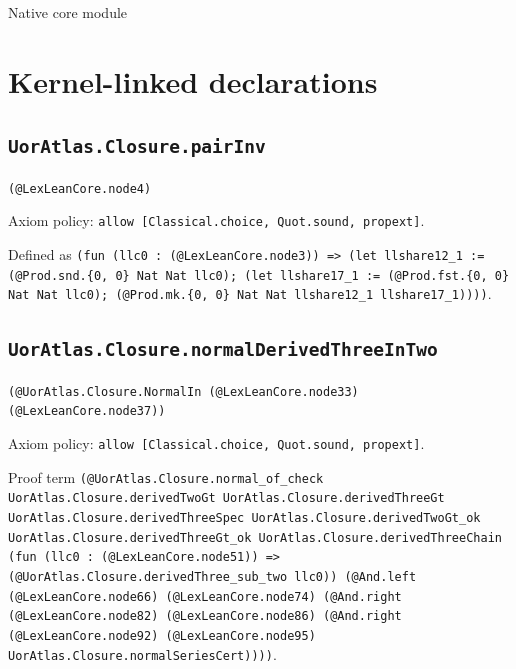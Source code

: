 \documentclass[11pt]{article}
\begin{document}
\begin{center}{\LARGE Native core module}\end{center}
\section*{Kernel-linked declarations}
\subsection*{\texttt{UorAtlas.Closure.pairInv}}
\noindent\texttt{(@LexLeanCore.node4)}\par
\noindent Axiom policy: \texttt{allow [Classical.choice, Quot.sound, propext]}.\par
\noindent Defined as \texttt{(fun (llc0 : (@LexLeanCore.node3)) => (let llshare12\_1 := (@Prod.snd.\{0, 0\} Nat Nat llc0); (let llshare17\_1 := (@Prod.fst.\{0, 0\} Nat Nat llc0); (@Prod.mk.\{0, 0\} Nat Nat llshare12\_1 llshare17\_1))))}.\par
\subsection*{\texttt{UorAtlas.Closure.normalDerivedThreeInTwo}}
\noindent\texttt{(@UorAtlas.Closure.NormalIn (@LexLeanCore.node33) (@LexLeanCore.node37))}\par
\noindent Axiom policy: \texttt{allow [Classical.choice, Quot.sound, propext]}.\par
\noindent Proof term \texttt{(@UorAtlas.Closure.normal\_of\_check UorAtlas.Closure.derivedTwoGt UorAtlas.Closure.derivedThreeGt UorAtlas.Closure.derivedThreeSpec UorAtlas.Closure.derivedTwoGt\_ok UorAtlas.Closure.derivedThreeGt\_ok UorAtlas.Closure.derivedThreeChain (fun (llc0 : (@LexLeanCore.node51)) => (@UorAtlas.Closure.derivedThree\_sub\_two llc0)) (@And.left (@LexLeanCore.node66) (@LexLeanCore.node74) (@And.right (@LexLeanCore.node82) (@LexLeanCore.node86) (@And.right (@LexLeanCore.node92) (@LexLeanCore.node95) UorAtlas.Closure.normalSeriesCert))))}.\par
\end{document}

